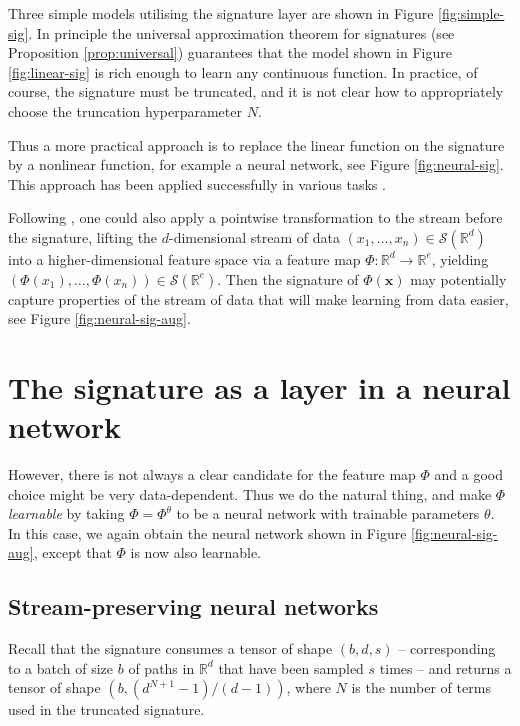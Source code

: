\documentclass{article}
\theoremstyle{plain}
\theoremstyle{definition}
\begin{document}
	Three simple models utilising the signature layer are shown in Figure \ref{fig:simple-sig}. In principle the universal approximation theorem for signatures (see Proposition \ref{prop:universal}) guarantees that the model shown in Figure \ref{fig:linear-sig} is rich enough to learn any continuous function. In practice, of course, the signature must be truncated, and it is not clear how to appropriately choose the truncation hyperparameter $N$.
	
	Thus a more practical approach is to replace the linear function on the signature by a nonlinear function, for example a neural network, see Figure \ref{fig:neural-sig}. This approach has been applied successfully in various tasks \cite{yang2015chinese, xie2018learning, yang2016dropsample, yang2016deepwriterid, li2017lpsnet, yang2017leveraging, yang2016rotation}.
	
	Following \cite{kiraly2016kernels, chevyrev2018signature}, one could also apply a pointwise transformation to the stream before the signature, lifting the $d$-dimensional stream of data $(x_1, \ldots, x_n) \in \mathcal S(\mathbb R^d)$ into a higher-dimensional feature space via a feature map $\Phi \colon \mathbb R^d \to \mathbb R^e$, yielding $(\Phi(x_1), \ldots, \Phi(x_n)) \in \mathcal S(\mathbb R^e)$. Then the signature of $\Phi(\mathbf x)$ may potentially capture properties of the stream of data that will make learning from data easier, see Figure \ref{fig:neural-sig-aug}.
	
	\section{The signature as a layer in a neural network}
	However, there is not always a clear candidate for the feature map $\Phi$ and a good choice might be very data-dependent. Thus we do the natural thing, and make $\Phi$ \emph{learnable} by taking $\Phi = \Phi^\theta$ to be a neural network with trainable parameters $\theta$. In this case, we again obtain the neural network shown in Figure \ref{fig:neural-sig-aug}, except that $\Phi$ is now also learnable.
	
	\subsection{Stream-preserving neural networks}
	
	Recall that the signature consumes a tensor of shape $(b, d, s)$ -- corresponding to a batch of size $b$ of paths in $\mathbb R^d$ that have been sampled $s$ times -- and returns a tensor of shape $(b, (d^{N + 1} - 1)/(d - 1))$, where $N$ is the number of terms used in the truncated signature.
	
\end{document}
